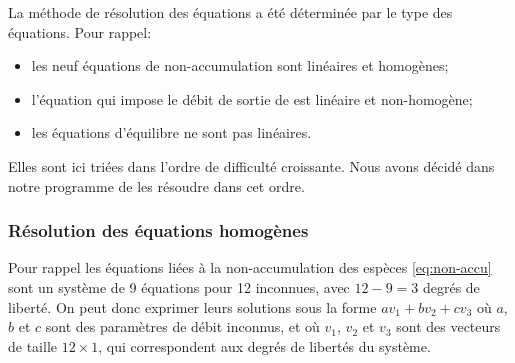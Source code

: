La méthode de résolution des équations a été déterminée par le type des équations.
Pour rappel:
\begin{itemize}
    \item les neuf équations de non-accumulation sont linéaires et homogènes;
    \item l'équation qui impose le débit de sortie de  est linéaire et non-homogène;
    \item les équations d'équilibre ne sont pas linéaires.
\end{itemize}

Elles sont ici triées dans l'ordre de difficulté croissante.
Nous avons décidé dans notre programme de les résoudre dans cet ordre.

\subsubsection{Résolution des équations homogènes}

Pour rappel les équations liées à la non-accumulation des espèces
\eqref{eq:non-accu}
sont un système de 9 équations pour 12 inconnues,
avec $12-9=3$ degrés de liberté.
On peut donc exprimer leurs solutions sous la forme $av_1 + bv_2 + cv_3$
où $a$, $b$ et $c$ sont des paramètres de débit inconnus,
et où $v_1$, $v_2$ et $v_3$ sont des vecteurs de taille $12\times 1$,
qui correspondent aux degrés de libertés du système.

